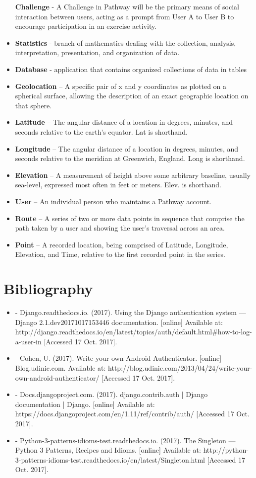 \documentclass{article}
\begin{document}
\begin{itemize}
    \itme \textbf{Challenge} - A Challenge in Pathway will be the primary means of social interaction between users, acting as a prompt from User A to User B to encourage participation in an exercise activity.
    \item \textbf{Statistics} - branch of mathematics dealing with the collection, analysis, interpretation, presentation, and organization of data.
    \item \textbf{Database} - application that contains organized collections of data in tables
    \item \textbf{Geolocation} – A specific pair of x and y coordinates as plotted on a spherical surface, allowing the description of an exact geographic location on that sphere.
    \item \textbf{Latitude} – The angular distance of a location in degrees, minutes, and seconds relative to the earth’s equator. Lat is shorthand.
    \item \textbf{Longitude} – The angular distance of a location in degrees, minutes, and seconds relative to the meridian at Greenwich, England. Long is shorthand.
    \item \textbf{Elevation} – A measurement of height above some arbitrary baseline, usually sea-level, expressed most often in feet or meters. Elev. is shorthand.
    \item \textbf{User} – An individual person who maintains a Pathway account.
    \item \textbf{Route} – A series of two or more data points in sequence that comprise the path taken by a user and showing the user’s traversal across an area.
    \item \textbf{Point} – A recorded location, being comprised of Latitude, Longitude, Elevation, and Time, relative to the first recorded point in the series.
\end{itemize}

\section{Bibliography}
\begin{itemize}
    \item -  Django.readthedocs.io. (2017). Using the Django authentication system — Django 2.1.dev20171017153446 documentation. [online] Available at: http://django.readthedocs.io/en/latest/topics/auth/default.html#how-to-log-a-user-in [Accessed 17 Oct. 2017].
    \item -  Cohen, U. (2017). Write your own Android Authenticator. [online] Blog.udinic.com. Available at: http://blog.udinic.com/2013/04/24/write-your-own-android-authenticator/ [Accessed 17 Oct. 2017].
    \item - Docs.djangoproject.com. (2017). django.contrib.auth | Django documentation | Django. [online] Available at: https://docs.djangoproject.com/en/1.11/ref/contrib/auth/ [Accessed 17 Oct. 2017].
    \item - Python-3-patterns-idioms-test.readthedocs.io. (2017). The Singleton — Python 3 Patterns, Recipes and Idioms. [online] Available at: http://python-3-patterns-idioms-test.readthedocs.io/en/latest/Singleton.html [Accessed 17 Oct. 2017].
\end{itemize}
\end{document}
